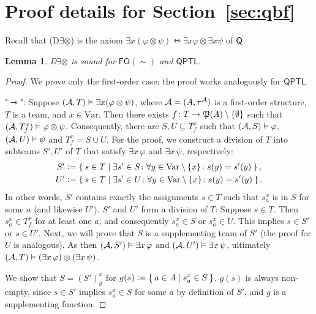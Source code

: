 \documentclass[a4paper,english,fleqn,11pt,final]{scrartcl}
\newcommand{\pow}[1]{{\protect\ensuremath{\mathord{\mathfrak{P}(\nobreak#1\nobreak)}}}}
\newcommand{\negg}{{\sim}}
\newcommand{\logic}[1]{\ensuremath{\mathsf{#1}}\xspace}
\newcommand{\FO}{\logic{FO}}
\newcommand{\QPTL}{\logic{QPTL}}
\newcommand{\Var}{\mathrm{Var}}
\newcommand{\calA}{\protect\ensuremath{\mathcal{A}}}
\newcommand{\sfQ}{\protect\ensuremath{\mathsf{Q}}}
\providecommand{\dfn}{\mathrel{\mathop:}=}
\newcommand{\tequiv}{\leftrightarrowtriangle}
\newcommand{\tens}{\otimes}
\newcommand{\Deriv}[1]{{\normalfont\textsf{#1}}}
\theoremstyle{plain}
\newtheorem{lemma}[theorem]{Lemma}
\theoremstyle{definition}
\begin{document}
\section{Proof details for Section~\ref{sec:qbf}}

Recall that \Deriv{(D$\exists\tens$)} is the axiom
$\exists x (\varphi \tens \psi) \tequiv \exists x \varphi \tens \exists x  \psi$ of $\sfQ$.

\begin{lemma}\label{lem:exists-sound}
\Deriv{D$\exists\tens$} is sound for $\FO(\negg)$ and $\QPTL$.
\end{lemma}
\begin{proof}
We prove only the first-order case; the proof works analogously for $\QPTL$.

"$\rightarrowtriangle$":
Suppose $(\calA, T) \vDash \exists x (\varphi \tens \psi)$, where $\calA = (A, \tau^\calA)$ is a first-order structure, $T$ is a team, and $x \in \Var$.
Then there exists $f \colon T \to \pow{A} \setminus \{\emptyset\}$ such that $(\calA, T^x_f) \vDash \varphi \tens \psi$.
Consequently, there are $S, U\subseteq T^x_f$ such that $(\calA, S) \vDash \varphi$, $(\calA, U)\vDash \psi$ and $T^x_f = S \cup U$.
For the proof, we construct a division of $T$ into subteams $S', U'$ of $T$ that satisfy $\exists x\, \varphi$ and $\exists x \, \psi$, respectively:
\begin{align*}
S' &\dfn \Set{ s \in T | \exists s' \in S \colon \forall y \in \Var \setminus \{x\} \colon s(y) = s'(y) }\text{,}\\
U' &\dfn \Set{ s \in T | \exists s' \in U \colon \forall y \in \Var \setminus \{x\} \colon s(y) = s'(y) }\text{.}
\end{align*}
In other words, $S'$ contains exactly the assignments $s\in T$ such that $s^x_a$ is in $S$ for some $a$ (and likewise $U'$).
$S'$ and $U'$ form a division of $T$: Suppose $s \in T$.
Then $s^x_a \in T^x_f$ for at least one $a$, and consequently $s^x_a \in S$ or $s^x_a \in U$.
This implies $s \in S'$ or $s \in U'$.
Next, we will prove that $S$ is a supplementing team of $S'$ (the proof for $U$ is analogous).
As then $(\calA, S') \vDash \exists x\, \varphi$ and $(\calA, U') \vDash \exists x\, \psi$, ultimately $(\calA,T) \vDash (\exists x\, \varphi)\tens(\exists x\, \psi)$.

\smallskip

We show that $S = (S')^x_g$ for $g(s) \dfn \Set{ a \in A | s^x_a \in S }$.
$g(s)$ is always non-empty, since $s \in S'$ implies $s^x_a \in S$ for some $a$ by definition of $S'$, and $g$ is a supplementing function.



\end{proof}
\end{document}
